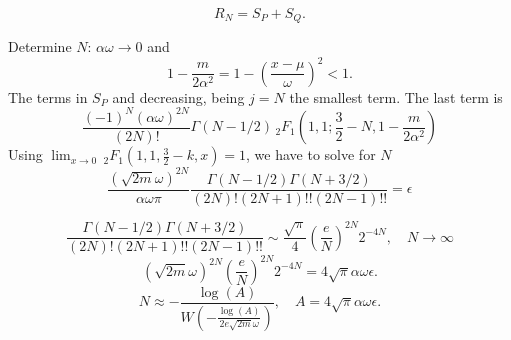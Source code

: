 \documentclass[10pt,a4paper,oneside]{article}
\numberwithin{equation}{section}
\begin{document}
\begin{equation}
R_N = S_P + S_Q.
\end{equation}

Determine $N$: $\alpha \omega \to 0$ and
\begin{equation}
1 - \frac{m}{2\alpha^2} = 1 - \left(\frac{x-\mu}{\omega}\right)^2 < 1.
\end{equation}
The terms in $S_P$ and decreasing, being $j=N$ the smallest term. The last term is
\begin{equation}
\frac{(-1)^N (\alpha\omega)^{2N}}{(2N)!} \Gamma(N - 1/2) \, _2F_1\left(1, 1; \frac{3}{2} -N, 1 - \frac{m}{2\alpha^2}\right)
\end{equation}
Using $\lim_{x \to 0}\, _2F_1\left(1, 1, \frac{3}{2}-k, x\right) = 1$, we have to solve for $N$
\begin{equation}
\frac{(\sqrt{2m} \omega)^{2N}}{\alpha\omega \pi} \frac{\Gamma(N - 1/2)\Gamma(N + 3/2)}{(2N)!(2N + 1)!! (2N - 1)!!} = \epsilon
\end{equation}

\begin{equation}
\frac{\Gamma(N - 1/2)\Gamma(N + 3/2)}{(2N)!(2N + 1)!! (2N - 1)!!} \sim \frac{\sqrt{\pi}}{4} \left(\frac{e}{N}\right)^{2N} 2^{-4N}, \quad N \to \infty
\end{equation}
\begin{equation}
(\sqrt{2m} \omega)^{2N} \left(\frac{e}{N}\right)^{2N} 2^{-4N} = 4\sqrt{\pi}\alpha\omega\epsilon.
\end{equation}
\begin{equation}\label{N_expansion_xmu_acc}
N \approx - \frac{\log(A)}{W\left(-\frac{\log(A)}{2 e \sqrt{2m} \omega} \right)}, \quad A = 4\sqrt{\pi}\alpha\omega\epsilon.
\end{equation}
\end{document}
